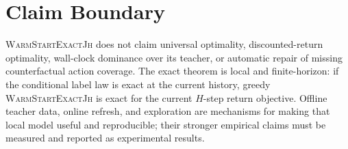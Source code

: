 \documentclass[11pt]{article}
\newcommand{\Warm}{\textnormal{\textsc{WarmStartExactJh}}}
\begin{document}
\section{Claim Boundary}
\label{sec:claims}

\Warm{} does not claim universal optimality, discounted-return optimality,
wall-clock dominance over its teacher, or automatic repair of missing
counterfactual action coverage. The exact theorem is local and finite-horizon:
if the conditional label law is exact at the current history, greedy
\Warm{} is exact for the current \(H\)-step return objective. Offline teacher
data, online refresh, and exploration are mechanisms for making that local
model useful and reproducible; their stronger empirical claims must be
measured and reported as experimental results.
\end{document}
